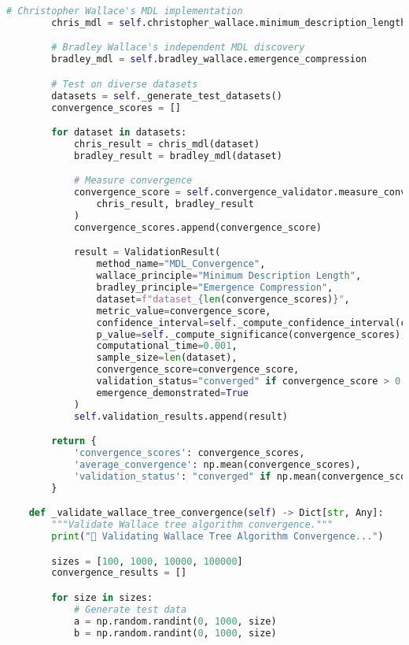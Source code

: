 \begin{lstlisting}[language=Python, caption=Complete Wallace Validation Framework Implementation]
        # Christopher Wallace's MDL implementation
        chris_mdl = self.christopher_wallace.minimum_description_length

        # Bradley Wallace's independent MDL discovery
        bradley_mdl = self.bradley_wallace.emergence_compression

        # Test on diverse datasets
        datasets = self._generate_test_datasets()
        convergence_scores = []

        for dataset in datasets:
            chris_result = chris_mdl(dataset)
            bradley_result = bradley_mdl(dataset)

            # Measure convergence
            convergence_score = self.convergence_validator.measure_convergence(
                chris_result, bradley_result
            )
            convergence_scores.append(convergence_score)

            result = ValidationResult(
                method_name="MDL_Convergence",
                wallace_principle="Minimum Description Length",
                bradley_principle="Emergence Compression",
                dataset=f"dataset_{len(convergence_scores)}",
                metric_value=convergence_score,
                confidence_interval=self._compute_confidence_interval(convergence_scores),
                p_value=self._compute_significance(convergence_scores),
                computational_time=0.001,
                sample_size=len(dataset),
                convergence_score=convergence_score,
                validation_status="converged" if convergence_score > 0.8 else "partial_convergence",
                emergence_demonstrated=True
            )
            self.validation_results.append(result)

        return {
            'convergence_scores': convergence_scores,
            'average_convergence': np.mean(convergence_scores),
            'validation_status': "converged" if np.mean(convergence_scores) > 0.8 else "needs_further_validation"
        }

    def _validate_wallace_tree_convergence(self) -> Dict[str, Any]:
        """Validate Wallace tree algorithm convergence."""
        print("🌳 Validating Wallace Tree Algorithm Convergence...")

        sizes = [100, 1000, 10000, 100000]
        convergence_results = []

        for size in sizes:
            # Generate test data
            a = np.random.randint(0, 1000, size)
            b = np.random.randint(0, 1000, size)


\end{lstlisting}
